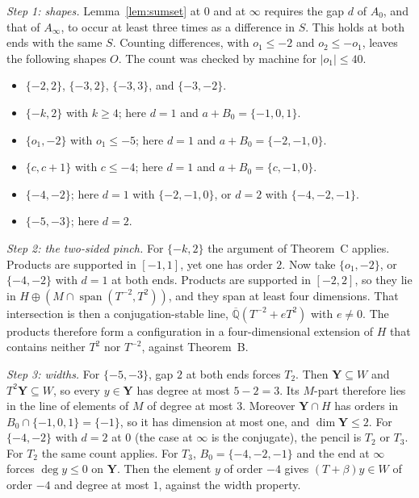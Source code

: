 \documentclass[11pt,a4paper]{article}
\theoremstyle{plain}
\theoremstyle{definition}
\newcommand{\Qbar}{\overline{\mathbb{Q}}}
\newcommand{\spn}{\operatorname{span}}
\begin{document}
\emph{Step 1: shapes.} Lemma~\ref{lem:sumset} at $0$ and at $\infty$ requires the gap $d$
of $A_{0}$, and that of $A_{\infty}$, to occur at least three times as a difference in
$S$. This holds at both ends with the same $S$. Counting differences, with
$o_{1}\le-2$ and $o_{2}\le-o_{1}$, leaves the following shapes $O$. The count was checked
by machine for $|o_{1}|\le40$.
\begin{itemize}
\item $\{-2,2\}$, $\{-3,2\}$, $\{-3,3\}$, and $\{-3,-2\}$.
\item $\{-k,2\}$ with $k\ge4$; here $d=1$ and $a+B_{0}=\{-1,0,1\}$.
\item $\{o_{1},-2\}$ with $o_{1}\le-5$; here $d=1$ and $a+B_{0}=\{-2,-1,0\}$.
\item $\{c,c+1\}$ with $c\le-4$; here $d=1$ and $a+B_{0}=\{c,-1,0\}$.
\item $\{-4,-2\}$; here $d=1$ with $\{-2,-1,0\}$, or $d=2$ with $\{-4,-2,-1\}$.
\item $\{-5,-3\}$; here $d=2$.
\end{itemize}

\emph{Step 2: the two-sided pinch.} For $\{-k,2\}$ the argument of Theorem~C applies.
Products are supported in $[-1,1]$, yet one has order $2$. Now take $\{o_{1},-2\}$, or
$\{-4,-2\}$ with $d=1$ at both ends. Products are supported in $[-2,2]$, so they lie in
$H\oplus(M\cap\spn(T^{-2},T^{2}))$, and they span at least four dimensions. That
intersection is then a conjugation-stable line, $\Qbar(T^{-2}+eT^{2})$ with $e\neq0$. The
products therefore form a configuration in a four-dimensional extension of $H$ that
contains neither $T^{2}$ nor $T^{-2}$, against Theorem~B.

\emph{Step 3: widths.} For $\{-5,-3\}$, gap $2$ at both ends forces $T_{2}$. Then
$\mathbf Y\subseteq W$ and $T^{2}\mathbf Y\subseteq W$, so every $y\in\mathbf Y$ has degree at most
$5-2=3$. Its $M$-part therefore lies in the line of elements of $M$ of degree at most
$3$. Moreover $\mathbf Y\cap H$ has orders in $B_{0}\cap\{-1,0,1\}=\{-1\}$, so it has
dimension at most one, and $\dim\mathbf Y\le2$. For $\{-4,-2\}$ with $d=2$ at $0$ (the case
at $\infty$ is the conjugate), the pencil is $T_{2}$ or $T_{3}$. For $T_{2}$ the same
count applies. For $T_{3}$, $B_{0}=\{-4,-2,-1\}$ and the end at $\infty$ forces
$\deg y\le0$ on $\mathbf Y$. Then the element $y$ of order $-4$ gives $(T+\beta)y\in W$ of
order $-4$ and degree at most $1$, against the width property.
\end{document}
